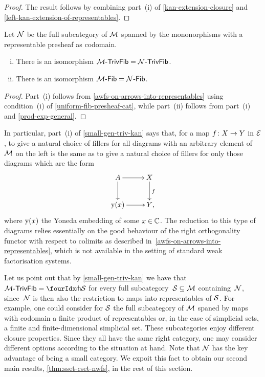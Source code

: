 \documentclass[reqno,10pt,a4paper,oneside,draft]{amsart}
\begin{document}
\begin{proof}
The result follows by combining part~(i) of \cref{kan-extension-closure} and \cref{left-kan-extension-of-representables}.
\end{proof}

\begin{lemma} \label{small-gen-triv-kan}
Let $\cal{N}$ be the full subcategory of $\cal{M}$ spanned by the mononorphisms with a representable presheaf as codomain.
\begin{enumerate}[(i)]
\item There is an isomorphism $\TrivFib{\cal{M}} = \TrivFib{\cal{N}}$.
\item There is an isomorphism $\Fib{\cal{M}} = \Fib{\cal{N}}$.
\end{enumerate}
\end{lemma}

\begin{proof}
Part~(i) follows from \cref{awfs-on-arrows-into-representables} using condition~(i) of \cref{uniform-fib-presheaf-cat}, while part~(ii) follows from part~(i) and \cref{prod-exp-general}.
\end{proof}

In particular, part~(i) of \cref{small-gen-triv-kan} says that, for a map $f \co X \to Y$ in $\catE$, to give a natural choice of fillers for all diagrams with an arbitrary element of $\cal{M}$ on the left is the same as to give a natural choice of fillers for only those diagrams which are the form
\[
\xymatrix{
  A
  \ar[r]
  \ar[d]
&
  X
  \ar[d]^f
\\
  \yon(x)
  \ar[r]
&
  Y
\rlap{,}}
\]
where $\yon(x)$ the Yoneda embedding of some $x \in \catC$.
The reduction to this type of diagrams relies essentially on the good behaviour of the right orthogonality functor with respect to colimits as described in~\cref{awfs-on-arrows-into-representables}, which is not available in the setting of standard weak factorisation systems.

\begin{remark}
Let us point out that by \cref{small-gen-triv-kan} we have that $\TrivFib{\cal{M}} = \liftr{\cal{S}}$ for every full subcategory~$\cal{S} \subseteq \cal{M}$ containing~$\cal{N}$, since~$\cal{N}$ is then also the restriction to maps into representables of $\cal{S}$.
For example, one could consider for $\cal{S}$ the full subcategory of $\cal{M}$ spaned by maps with codomain a finite product of representables or, in the case of simplicial sets, a finite and finite-dimensional simplicial set.
These subcategories enjoy different closure properties.
Since they all have the same right category, one may consider different options according to the situation at hand.
Note that $\cal{N}$ has the key advantage of being a small category.
We expoit this fact to obtain our second main results, \cref{thm:sset-cset-nwfs}, in the rest of this section.
\end{remark}
\end{document}
